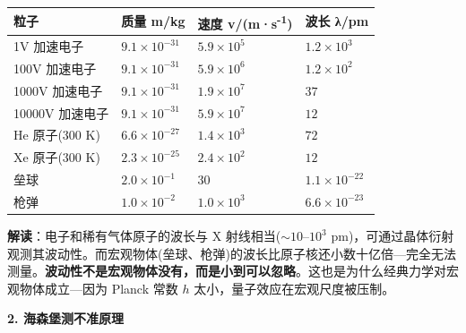 {\def\LTcaptype{none} %
\begin{longtable}[]{@{}
  >{\raggedright\arraybackslash}p{}
  >{\raggedleft\arraybackslash}p{}
  >{\centering\arraybackslash}p{}
  >{\centering\arraybackslash}p{}@{}}
\toprule\noalign{}
\begin{minipage}[b]{\linewidth}\raggedright
粒子
\end{minipage} & \begin{minipage}[b]{\linewidth}\raggedleft
质量 m/kg
\end{minipage} & \begin{minipage}[b]{\linewidth}\centering
速度 v/(m·s\textsuperscript{-1})
\end{minipage} & \begin{minipage}[b]{\linewidth}\centering
波长 λ/pm
\end{minipage} \\
\midrule\noalign{}
\endhead
\bottomrule\noalign{}
\endlastfoot
1V 加速电子 & \(9.1\times 10^{-31}\) & \(5.9\times 10^5\) & \(1.2\times 10^{3}\) \\
100V 加速电子 & \(9.1\times 10^{-31}\) & \(5.9\times 10^6\) & \(1.2\times 10^{2}\) \\
1000V 加速电子 & \(9.1\times 10^{-31}\) & \(1.9\times 10^7\) & \(37\) \\
10000V 加速电子 & \(9.1\times 10^{-31}\) & \(5.9\times 10^7\) & \(12\) \\
He 原子(300 K) & \(6.6\times 10^{-27}\) & \(1.4\times 10^3\) & \(72\) \\
Xe 原子(300 K) & \(2.3\times 10^{-25}\) & \(2.4\times 10^2\) & \(12\) \\
垒球 & \(2.0\times 10^{-1}\) & \(30\) & \(1.1\times 10^{-22}\) \\
枪弹 & \(1.0\times 10^{-2}\) & \(1.0\times 10^3\) & \(6.6\times 10^{-23}\) \\
\end{longtable}
}

\textbf{解读}：电子和稀有气体原子的波长与 X 射线相当(\(\sim 10\text{–}10^3\) pm)，可通过晶体衍射观测其波动性。而宏观物体(垒球、枪弹)的波长比原子核还小数十亿倍---完全无法测量。\textbf{波动性不是宏观物体没有，而是小到可以忽略}。这也是为什么经典力学对宏观物体成立---因为 Planck 常数 \(h\) 太小，量子效应在宏观尺度被压制。

\textbf{2. 海森堡测不准原理}

